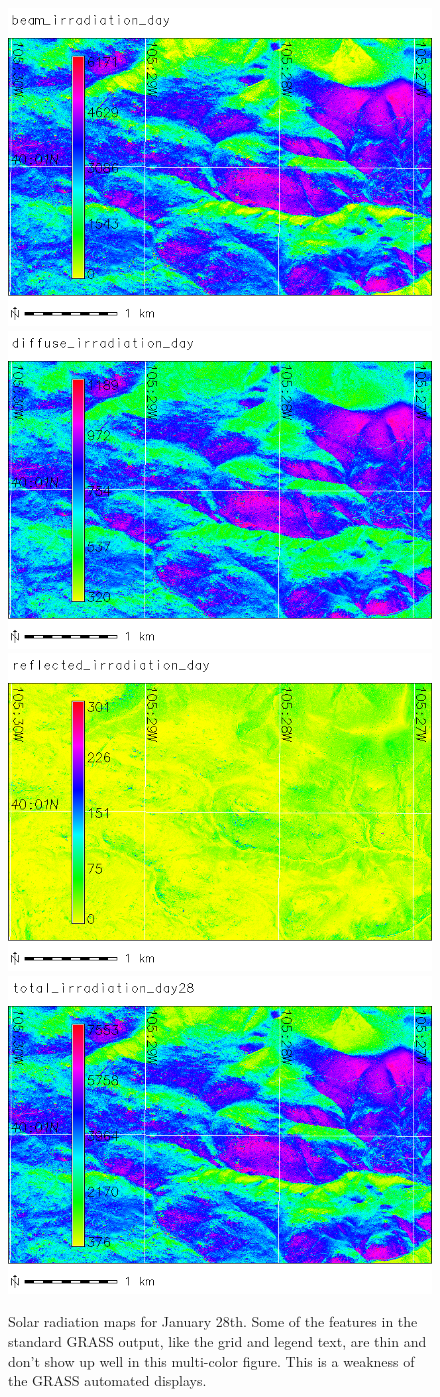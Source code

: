 \documentclass{book}
\begin{document}
\begin{figure}[h]
 \begin{center}
 \includegraphics[width=.45\linewidth]{figures/d.out.file/beam_irradiation_day.png}
 \includegraphics[width=.45\linewidth]{figures/d.out.file/diffuse_irradiation_day.png}
 \vspace{3mm}
 \includegraphics[width=.45\linewidth]{figures/d.out.file/reflected_irradiation_day.png}
 \includegraphics[width=.45\linewidth]{figures/d.out.file/total_irradiation_day28.png}
 \caption{Solar radiation maps for January 28th. Some of the features in the standard GRASS output, like the grid and legend text, are thin and don't show up well in this multi-color figure. This is a weakness of the GRASS automated displays.}
 \label{fig:rad}
 \end{center}
\end{figure}
\end{document}
